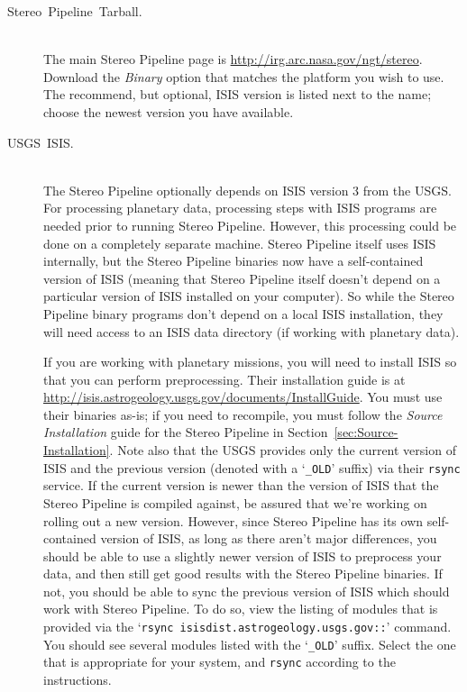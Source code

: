 \begin{description}
\item [{Stereo~Pipeline~Tarball.}] \hspace*{\fill} \\
The main Stereo Pipeline page is
\url{http://irg.arc.nasa.gov/ngt/stereo}.  Download the \emph{Binary}
option that matches the platform you wish to use. The recommend, but
optional, \ac{ISIS} version is listed next to the name; choose the
newest version you have available.

\item [{USGS~ISIS.}] \hspace*{\fill} \\
The Stereo Pipeline optionally depends on \ac{ISIS} version 3 from the
\ac{USGS}\@.  For processing planetary data, processing steps
with ISIS programs are needed prior to running Stereo Pipeline. 
However, this processing could be done on a completely separate
machine.  Stereo Pipeline itself uses ISIS internally, but the
Stereo Pipeline binaries now have a self-contained version of
ISIS (meaning that Stereo Pipeline itself doesn't depend on a
particular version of ISIS installed on your computer).  So 
while the Stereo Pipeline binary programs don't depend on a local 
ISIS installation, they will need access to an ISIS data directory
(if working with planetary data).

If you are working with planetary missions, you will need to install
ISIS so that you can perform preprocessing.  Their installation
guide is at \url{http://isis.astrogeology.usgs.gov/documents/InstallGuide}.
You must use their binaries as-is; if you need to recompile, you
must follow the \emph{Source Installation} guide for the Stereo
Pipeline in Section~\ref{sec:Source-Installation}.  Note also that
the \ac{USGS} provides only the current version of \ac{ISIS} and
the previous version (denoted with a `\texttt{\_OLD}' suffix) via
their \texttt{rsync} service.  If the current version is newer than
the version of ISIS that the Stereo Pipeline is compiled against,
be assured that we're working on rolling out a new version.  However,
since Stereo Pipeline has its own self-contained version of ISIS,
as long as there aren't major differences, you should be able to
use a slightly newer version of ISIS to preprocess your data, and
then still get good results with the Stereo Pipeline binaries.  If
not, you should be able to sync the previous version of ISIS which
should work with Stereo Pipeline.  To do so, view the listing of
modules that is provided via the
`\texttt{rsync~isisdist.astrogeology.usgs.gov::}' command.  You
should see several modules listed with the `\texttt{\_OLD}' suffix.
Select the one that is appropriate for your system, and \texttt{rsync}
according to the instructions.


\end{description}
